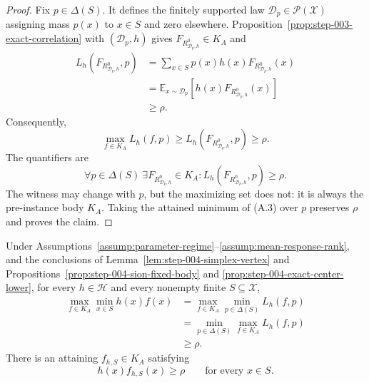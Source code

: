 \begin{proof}
Fix \(p\in\Delta(S)\).  It defines the finitely supported law
\(\mathcal D_p\in\mathcal P(\mathcal X)\) assigning mass \(p(x)\) to
\(x\in S\) and zero elsewhere.  Proposition~\ref{prop:step-003-exact-correlation}
with \((\mathcal D_p,h)\) gives
\(F_{R^0_{\mathcal D_p,h}}\in K_A\) and
\[
\begin{aligned}
L_h(F_{R^0_{\mathcal D_p,h}},p)
&=\sum_{x\in S}p(x)h(x)F_{R^0_{\mathcal D_p,h}}(x)\\
&=\mathbb E_{x\sim\mathcal D_p}
[h(x)F_{R^0_{\mathcal D_p,h}}(x)]\\
&\ge\rho.
\end{aligned}
\]
Consequently,
\[
\max_{f\in K_A}L_h(f,p)
\ge L_h(F_{R^0_{\mathcal D_p,h}},p)
\ge\rho.
\tag{A.3}
\]
The quantifiers are
\[
\forall p\in\Delta(S)\ \exists F_{R^0_{\mathcal D_p,h}}\in K_A:
L_h(F_{R^0_{\mathcal D_p,h}},p)\ge\rho.
\]
The witness may change with \(p\), but the maximizing set does not: it is
always the pre-instance body \(K_A\).  Taking the attained minimum of (A.3)
over \(p\) preserves \(\rho\) and proves the claim.
\end{proof}

\begin{proposition}
\label{prop:step-004-finite-margin}
Under Assumptions~\ref{assump:parameter-regime}--\ref{assump:mean-response-rank},
and the conclusions of Lemma~\ref{lem:step-004-simplex-vertex} and
Propositions~\ref{prop:step-004-sion-fixed-body} and
\ref{prop:step-004-exact-center-lower}, for every \(h\in\mathcal H\) and
every nonempty finite \(S\subseteq\mathcal X\),
\[
\begin{aligned}
\max_{f\in K_A}\min_{x\in S}h(x)f(x)
&=\max_{f\in K_A}\min_{p\in\Delta(S)}L_h(f,p)\\
&=\min_{p\in\Delta(S)}\max_{f\in K_A}L_h(f,p)\\
&\ge\rho.
\end{aligned}
\]
There is an attaining \(f_{h,S}\in K_A\) satisfying
\[
h(x)f_{h,S}(x)\ge\rho
\qquad\text{for every }x\in S.
\]
\end{proposition}


